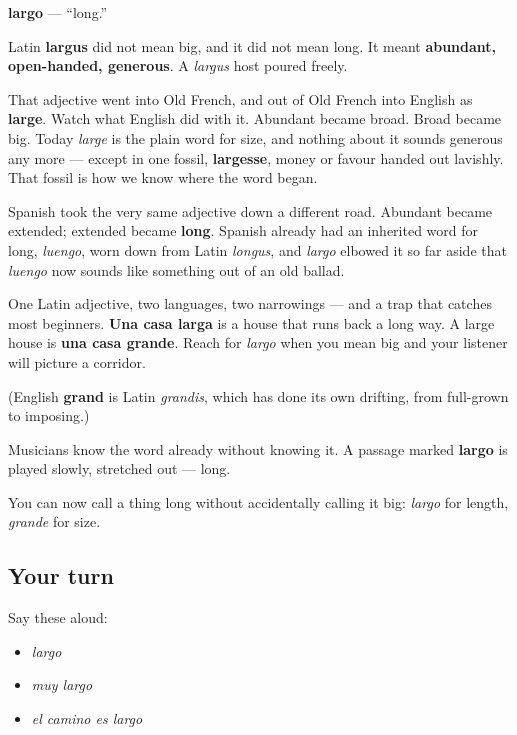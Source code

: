 \begin{cousinweb}
\textbf{largo} — \textquotedblleft{}long.\textquotedblright{}

Latin \textbf{largus} did not mean big, and it did not mean long. It meant \textbf{abundant, open-handed, generous}. A \emph{largus} host poured freely.

That adjective went into Old French, and out of Old French into English as \textbf{large}. Watch what English did with it. Abundant became broad. Broad became big. Today \emph{large} is the plain word for size, and nothing about it sounds generous any more — except in one fossil, \textbf{largesse}, money or favour handed out lavishly. That fossil is how we know where the word began.

Spanish took the very same adjective down a different road. Abundant became extended; extended became \textbf{long}. Spanish already had an inherited word for long, \emph{luengo}, worn down from Latin \emph{longus}, and \emph{largo} elbowed it so far aside that \emph{luengo} now sounds like something out of an old ballad.

One Latin adjective, two languages, two narrowings — and a trap that catches most beginners. \textbf{Una casa larga} is a house that runs back a long way. A large house is \textbf{una casa grande}. Reach for \emph{largo} when you mean big and your listener will picture a corridor.

(English \textbf{grand} is Latin \emph{grandis}, which has done its own drifting, from full-grown to imposing.)

Musicians know the word already without knowing it. A passage marked \textbf{largo} is played slowly, stretched out — long.
\end{cousinweb}

\begin{grammarlens}[title={What you've built}]
You can now call a thing long without accidentally calling it big: \emph{largo} for length, \emph{grande} for size.
\end{grammarlens}

\subsection*{Your turn}
Say these aloud:

\begin{itemize}
\raggedright
  \item \emph{largo}
  \item \emph{muy largo}
  \item \emph{el camino es largo}
\end{itemize}

